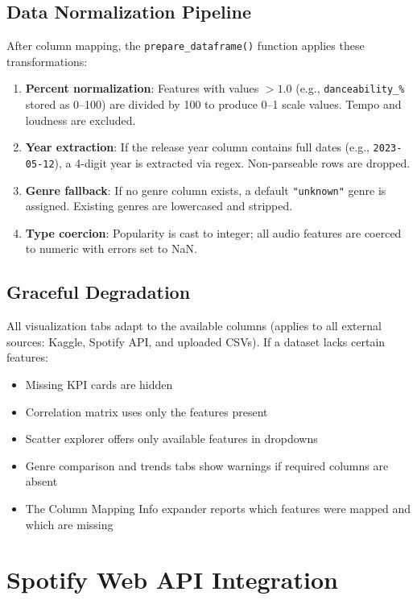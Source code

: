 \documentclass[12pt,a4paper]{article}
\begin{document}
\subsection{Data Normalization Pipeline}

After column mapping, the \texttt{prepare\_dataframe()} function applies these transformations:

\begin{enumerate}[noitemsep]
    \item \textbf{Percent normalization}: Features with values $> 1.0$ (e.g., \texttt{danceability\_\%} stored as 0--100) are divided by 100 to produce 0--1 scale values. Tempo and loudness are excluded.
    \item \textbf{Year extraction}: If the release year column contains full dates (e.g., \texttt{2023-05-12}), a 4-digit year is extracted via regex. Non-parseable rows are dropped.
    \item \textbf{Genre fallback}: If no genre column exists, a default \texttt{"unknown"} genre is assigned. Existing genres are lowercased and stripped.
    \item \textbf{Type coercion}: Popularity is cast to integer; all audio features are coerced to numeric with errors set to NaN.
\end{enumerate}

\subsection{Graceful Degradation}

All visualization tabs adapt to the available columns (applies to all external sources: Kaggle, Spotify API, and uploaded CSVs). If a dataset lacks certain features:
\begin{itemize}[noitemsep]
    \item Missing KPI cards are hidden
    \item Correlation matrix uses only the features present
    \item Scatter explorer offers only available features in dropdowns
    \item Genre comparison and trends tabs show warnings if required columns are absent
    \item The Column Mapping Info expander reports which features were mapped and which are missing
\end{itemize}

\section{Spotify Web API Integration}
\label{sec:spotify-api}
\end{document}
